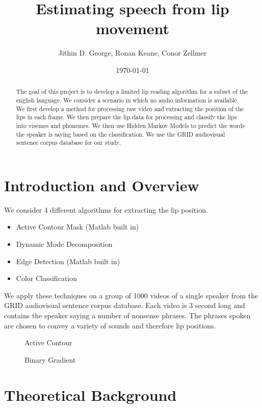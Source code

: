 \documentclass[a4paper]{article}
\title{Estimating speech from lip movement}
\author{Jithin D. George, Ronan Keane, Conor Zellmer}
\date{\today}
\begin{document}
\maketitle

\begin{abstract}
The goal of this project is to develop a limited lip reading algorithm for a subset of the english language. We consider a scenario in which no audio information is available. We first develop a method for processing raw video and extracting the position of the lips in each frame. We then prepare the lip data for processing and classify the lips into visemes and phonemes. We then use Hidden Markov Models to predict the words the speaker is saying based on  the classification. We use the GRID audiovisual sentence corpus database for our study. 
\end{abstract}

\section{Introduction and Overview}
\label{sec:introduction}


We consider 4 different algorithms for extracting the lip position. \begin{itemize}
	\item Active Contour Mask (Matlab built in)
	\item Dynamic Mode Decomposition 
	\item Edge Detection (Matlab built in)
	\item Color Classification
\end{itemize}
We apply these techniques on a group of 1000 videos of a single speaker from the GRID audiovisual sentence corpus database. Each video is 3 second long and contains the speaker saying a number of nonsense phrases. The phrases spoken are chosen to convey a variety of sounds and therefore lip positions.

\begin{figure}[H] 
	\centering
	\caption{Active Contour}	
\end{figure}

\begin{figure}[H] 
	\centering
	\caption{Binary Gradient}	
\end{figure}



\section{Theoretical Background}
\label{sec:theory}
\end{document}
